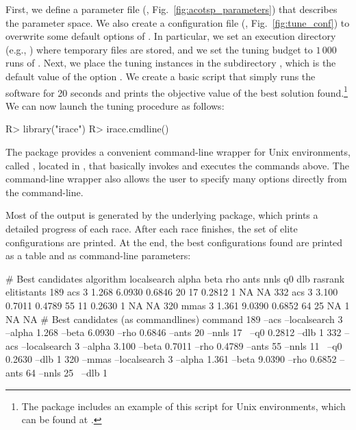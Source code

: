 \documentclass[article,a4paper,nojss,notitle]{jss}
\newcommand{\irace}{\pkg{irace}\xspace}
\newcommand{\race}{\pkg{race}\xspace}
\newcommand{\aR}{\proglang{R}\xspace}
\newcommand{\parameter}[1]{\code{#1}}
\newcommand{\SoftwarePackage}{\pkg}
\newcommand{\ACOTSP}{\SoftwarePackage{ACOTSP}\xspace}
\begin{document}
First, we define a parameter file (,
Fig.~\ref{fig:acotsp_parameters}) that describes the parameter space.
We also create a configuration file (,
Fig.~\ref{fig:tune_conf}) to overwrite some default options of \irace.
In particular, we set an execution directory (e.g., )
where temporary files are stored, and we set the tuning budget to
$1\,000$ runs of \ACOTSP. Next, we place the tuning instances in the
subdirectory , which is the default value of the
option \parameter{instanceDir}. We create a basic 
script that simply runs the \ACOTSP software for 20 seconds and prints
the objective value of the best solution found.\footnote{The package
  includes an example of this  script for Unix
  environments, which can be found at
  .}
We can now launch the tuning procedure as follows:
  \begin{CodeInput}
R> library("irace")
R> irace.cmdline()
\end{CodeInput}

The package provides a convenient command-line wrapper for Unix
environments, called , located in
, that basically
invokes \aR and executes the commands above. The command-line wrapper
also allows the user to specify many options directly from the
command-line.

Most of the output is generated by the underlying \race package, which
prints a detailed progress of each race. After each race finishes, the
set of elite configurations are printed. At the end, the best
configurations found are printed as a table and as command-line
parameters:

\begin{footnotesize}
\begin{CodeOutput}
# Best candidates
    algorithm localsearch alpha   beta    rho ants nnls     q0 dlb rasrank elitistants
189       acs           3 1.268 6.0930 0.6846   20   17 0.2812   1      NA          NA
332       acs           3 3.100 0.7011 0.4789   55   11 0.2630   1      NA          NA
320      mmas           3 1.361 9.0390 0.6852   64   25     NA   1      NA          NA
# Best candidates (as commandlines)
                                                                                  command
189  --acs --localsearch 3 --alpha 1.268 --beta 6.0930 --rho  0.6846 --ants 20 --nnls 17  \
    --q0 0.2812 --dlb 1
332  --acs --localsearch 3 --alpha 3.100 --beta 0.7011 --rho  0.4789 --ants 55 --nnls 11  \
    --q0 0.2630 --dlb 1
320  --mmas --localsearch 3 --alpha 1.361 --beta 9.0390 --rho  0.6852 --ants 64 --nnls 25 \
    --dlb 1
\end{CodeOutput}
\end{footnotesize}
\end{document}
